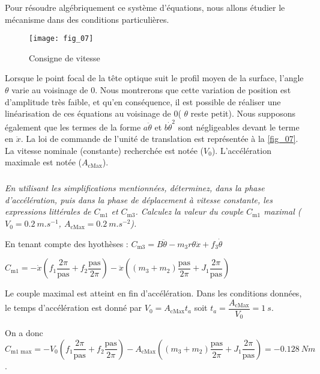 


 Pour résoudre algébriquement ce système d’équations, nous allons
étudier le mécanisme dans des conditions
particulières.

\begin{figure}[H]
\centering
\texttt{[image: fig\_07]}
\caption{\label{fig_07} Consigne de vitesse}
\end{figure}

Lorsque le point focal de la tête optique suit le profil
moyen de la surface, l’angle $\theta$ varie au voisinage
de 0\degres. Nous montrerons %
que cette
variation de position est d’amplitude très faible, et
qu’en conséquence, il est possible de réaliser une linéarisation de ces équations au voisinage de 0\degres ( $\theta$ reste
petit). Nous supposons également que les termes de la forme $a\ddot{\theta}$  et $b\dot{\theta}^2$ sont négligeables devant le terme en $\ddot{x}$.
La loi de commande de l’unité de translation est représentée à la \autoref{fig_07}. La vitesse nominale (constante)
recherchée est notée ($V_0$). L’accélération maximale est notée ($A_{\text{cMax}}$).

\fi

\subparagraph{\label{q_07}}\textit{En utilisant les simplifications mentionnées, déterminez, dans la phase d’accélération, puis dans la phase de déplacement à vitesse constante, les expressions littérales de $C_{\text{m1}}$ et $C_{\text{m3}}$.
Calculez la valeur du couple $C_{\text{m1}}$ maximal ($V_0 = \SI{0,2}{m.s^{-1}}$, $A_{\text{cMax}}=\SI{0,2}{m.s^{-2}}$).}
\ifprof
\begin{corrige}
En tenant compte des hyothèses : 
$ C_{\text{m3}} = B\ddot{\theta}  - m_3 r\theta \ddot{x} + f_3 \dot{\theta}   $

 $C_{\text{m1}} 
  =
   - \dot{x}\left( f_1\dfrac{2\pi}{\text{pas}} +f_2  \dfrac{\text{pas}}{2\pi}\right)
- \ddot{x}\left( \left( m_3+m_2 \right)\dfrac{\text{pas}}{2\pi}+ J_1 \dfrac{2\pi}{\text{pas}} \right)
$


Le couple maximal est atteint en fin d'accélération. Dans les conditions données, le temps d'accélération est donné par 
$V_0 = A_{\text{cMax}} t_a$ soit $ t_a  = \dfrac{A_{\text{cMax}}}{V_0} = \SI{1}{s}$.

On a donc 
 $C_{\text{m1 max}} 
  =
   - V_0\left( f_1\dfrac{2\pi}{\text{pas}} +f_2  \dfrac{\text{pas}}{2\pi}\right)
-  A_{\text{cMax}}\left( \left( m_3+m_2 \right)\dfrac{\text{pas}}{2\pi}+ J_1 \dfrac{2\pi}{\text{pas}} \right) = -\SI{0,128}{Nm}$.

\end{corrige}
\else
\fi

